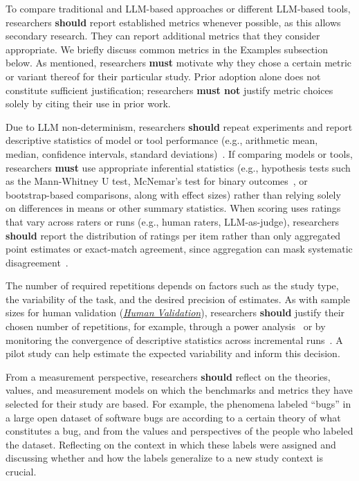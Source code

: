 \documentclass[smallextended]{svjour3}
\newcommand{\must}{\textbf{must}\xspace}
\newcommand{\mustnot}{\textbf{must not}\xspace}
\newcommand{\should}{\textbf{should}\xspace}
\newcommand{\humanvalidation}{\hyperref[sec:use-human-validation-for-llm-outputs]{\emph{Human Validation}}\xspace}
\newcommand{\humanvalidation}{\href{/guidelines\#use-human-validation-for-llm-outputs}{\emph{Human Validation}}\xspace}
\begin{document}
To compare traditional and LLM-based approaches or different LLM-based tools, researchers \should report established metrics whenever possible, as this allows secondary research.
They can report additional metrics that they consider appropriate.
We briefly discuss common metrics in the Examples subsection below.
As mentioned, researchers \must motivate why they chose a certain metric or variant thereof for their particular study.
Prior adoption alone does not constitute sufficient justification; researchers \mustnot justify metric choices solely by citing their use in prior work.

Due to LLM non-determinism, researchers \should repeat experiments and report descriptive statistics of model or tool performance (e.g., arithmetic mean, median, confidence intervals, standard deviations)~\cite{DBLP:conf/nips/AgarwalSCCB21, DBLP:journals/corr/abs-2602-07150}. If comparing models or tools, researchers \must use appropriate inferential statistics (e.g., hypothesis tests such as the Mann-Whitney U test, McNemar's test for binary outcomes~\cite{DBLP:conf/iclr/KublerBKZYKK26}, or bootstrap-based comparisons, along with effect sizes) rather than relying solely on differences in means or other summary statistics. When scoring uses ratings that vary across raters or runs (e.g., human raters, LLM-as-judge), researchers \should report the distribution of ratings per item rather than only aggregated point estimates or exact-match agreement, since aggregation can mask systematic disagreement~\cite{bean2025measuring}.

The number of required repetitions depends on factors such as the study type, the variability of the task, and the desired precision of estimates. As with sample sizes for human validation (\humanvalidation), researchers \should justify their chosen number of repetitions, for example, through a power analysis~\cite{Cohen1992, DBLP:journals/corr/abs-2602-07150} or by monitoring the convergence of descriptive statistics across incremental runs~\cite{DBLP:journals/corr/abs-2410-03492}. A pilot study can help estimate the expected variability and inform this decision.

From a measurement perspective, researchers \should reflect on the theories, values, and measurement models on which the benchmarks and metrics they have selected for their study are based.
For example, the phenomena labeled ``bugs'' in a large open dataset of software bugs are according to a certain theory of what constitutes a bug, and from the values and perspectives of the people who labeled the dataset. Reflecting on the context in which these labels were assigned and discussing whether and how the labels generalize to a new study context is crucial.
\end{document}
